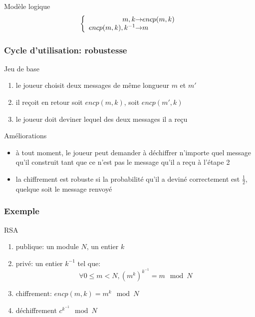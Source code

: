 \begin{reveals}
\begin{frame}
  \vfill

  \begin{block}{Modèle logique}
    \[
      \left\lbrace
        \begin{array}{r@{\ensuremath{\rightarrow}}l}
          m,k & encp(m,k) \\
          encp(m,k),k^{-1} & m\\
        \end{array}
      \right.
    \]
  \end{block}

  \vfill


\end{frame}

\begin{frame}
  \frametitle{Cycle d'utilisation: robustesse}

  \vfill

   \begin{block}{Jeu de base}
     \begin{enumerate}
     \item le joueur choisit deux messages de même longueur \(m\) et \(m'\)
     \item il reçoit en retour soit \(encp(m,k)\), soit \(encp(m',k)\)
     \item le joueur doit deviner lequel des deux messages il a reçu
     \end{enumerate}
  \end{block}

  \vfill

  \begin{block}{Améliorations}
    \begin{itemize}
    \item à tout moment, le joueur peut demander à déchiffrer
      n'importe quel message qu'il construit tant que ce n'est pas le
      message qu'il a reçu à l'étape 2
    \item la chiffrement est robuste si la probabilité qu'il a deviné
      correctement est \(\frac 12\), quelque soit le message renvoyé
    \end{itemize}
  \end{block}

  \vfill



\end{frame}

\begin{frame}
  \frametitle{Exemple}

  \vfill

   \begin{block}{RSA}
     \begin{enumerate}
     \item publique: un module \(N\), un entier \(k\)
     \item privé: un entier \(k^{-1}\) tel que:
       \[
         \forall 0\le m < N, \left(m^k\right)^{k^{-1}} = m \mod N
       \]
     \item chiffrement: \(encp(m,k)=m^k \mod N\)
     \item déchiffrement \( c^{k^{-1}} \mod N\)
     \end{enumerate}
  \end{block}


\end{frame}
\end{reveals}
